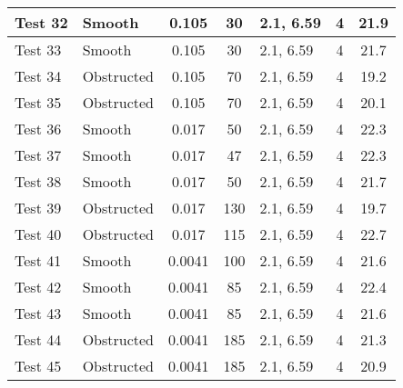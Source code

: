 \begin{table}[!ht]
\begin{center}
\begin {tabular}{|l|l|c|c|l|c|c|}
Test 32    &  Smooth        &  0.105            &  30                 &  2.1, 6.59  &  4              &  21.9              \\ \hline
Test 33    &  Smooth        &  0.105            &  30                 &  2.1, 6.59  &  4              &  21.7              \\ \hline
Test 34    &  Obstructed    &  0.105            &  70                 &  2.1, 6.59  &  4              &  19.2              \\ \hline
Test 35    &  Obstructed    &  0.105            &  70                 &  2.1, 6.59  &  4              &  20.1              \\ \hline
Test 36    &  Smooth        &  0.017            &  50                 &  2.1, 6.59  &  4              &  22.3              \\ \hline
Test 37    &  Smooth        &  0.017            &  47                 &  2.1, 6.59  &  4              &  22.3              \\ \hline
Test 38    &  Smooth        &  0.017            &  50                 &  2.1, 6.59  &  4              &  21.7              \\ \hline
Test 39    &  Obstructed    &  0.017            &  130                &  2.1, 6.59  &  4              &  19.7              \\ \hline
Test 40    &  Obstructed    &  0.017            &  115                &  2.1, 6.59  &  4              &  22.7              \\ \hline
Test 41    &  Smooth        &  0.0041           &  100                &  2.1, 6.59  &  4              &  21.6              \\ \hline
Test 42    &  Smooth        &  0.0041           &  85                 &  2.1, 6.59  &  4              &  22.4              \\ \hline
Test 43    &  Smooth        &  0.0041           &  85                 &  2.1, 6.59  &  4              &  21.6              \\ \hline
Test 44    &  Obstructed    &  0.0041           &  185                &  2.1, 6.59  &  4              &  21.3              \\ \hline
Test 45    &  Obstructed    &  0.0041           &  185                &  2.1, 6.59  &  4              &  20.9              \\ \hline
\end{tabular}
\end{center}
\end{table}


